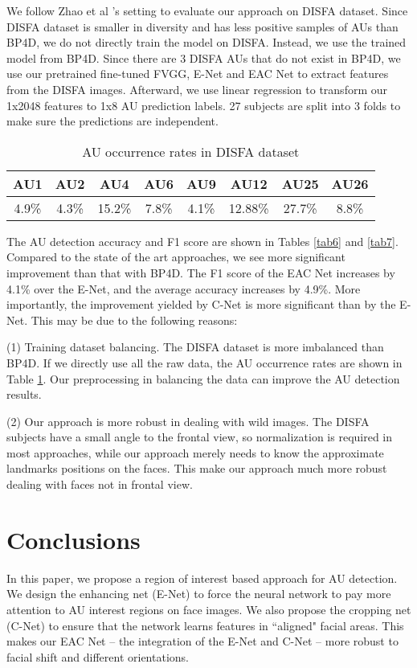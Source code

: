 \documentclass[a4paper, 10pt, conference]{ieeeconf}      %
\begin{document}
We follow Zhao et al \cite{p22}'s setting to evaluate our approach on DISFA dataset. Since DISFA dataset is smaller in diversity and has less positive samples of AUs than BP4D, we do not directly train the model on DISFA. Instead, we use the trained model from BP4D. Since there are 3 DISFA AUs that do not exist in BP4D, we use our pretrained fine-tuned FVGG, {\color {black} E-Net and EAC Net to extract features from the DISFA images. Afterward, we use linear regression to transform our 1x2048 features to 1x8 AU prediction labels.} 27 subjects are split into 3 folds to make sure the predictions are independent.
\begin{table}
\caption{AU occurrence rates in DISFA dataset}
\label{tab8}
\begin{center}
\begin{tabular}{|c|c|c|c|c|c|c|c|}
\hline
AU1&AU2&AU4&AU6&AU9&AU12&AU25&AU26\\
\hline
4.9\%&4.3\%&15.2\%&7.8\%&4.1\%&12.88\%&27.7\%&8.8\%\\
\hline
\end{tabular}
\end{center}
\end{table}
The AU detection accuracy and F1 score are shown in Tables \ref{tab6} and \ref{tab7}. Compared to the state of the art approaches, we see more significant improvement than that with BP4D. The F1 score of the EAC Net increases by 4.1\% over the E-Net, and the average accuracy increases by 4.9\%. More importantly, the improvement yielded by C-Net is more significant than by the E-Net. This may be due to the following reasons:

(1) Training dataset balancing. The DISFA dataset is more imbalanced than BP4D. If we directly use all the raw data, the AU occurrence rates are shown in Table \ref{tab8}. Our preprocessing in balancing the data can improve the AU detection results.

(2) Our approach is more robust in dealing with wild images. The DISFA subjects have a small angle to the frontal view, so normalization is required in most approaches, while our approach merely needs to know the approximate landmarks positions on the faces. This make our approach much more robust dealing with faces not in frontal view.

\section{Conclusions}

In this paper, we propose a region of interest based approach for AU detection. We design the enhancing net (E-Net) to force the neural network to pay more attention to AU interest regions on face images. We also propose the cropping net (C-Net) to ensure that the network learns features in ``aligned" facial areas. This makes our EAC Net -- the integration of the E-Net and C-Net -- more robust to facial shift and different orientations.
\end{document}
